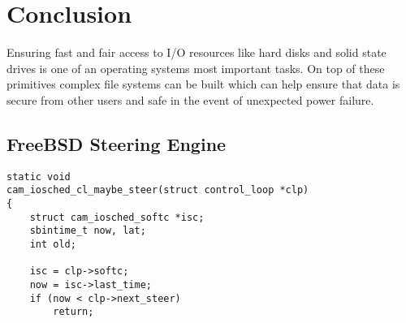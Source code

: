 \documentclass[10pt,conference,draftclsnofoot,onecolumn]{IEEEtran}
\begin{document}
\section{Conclusion}
Ensuring fast and fair access to I/O resources like hard disks and solid state drives is one of an operating systems most important tasks. On top of these primitives complex file systems can be built which can help ensure that data is secure from other users and safe in the event of unexpected power failure.

\clearpage
\printbibliography

\clearpage

\begin{appendices}
\section{FreeBSD Steering Engine}

\begin{lstlisting}
static void
cam_iosched_cl_maybe_steer(struct control_loop *clp)
{
	struct cam_iosched_softc *isc;
	sbintime_t now, lat;
	int old;

	isc = clp->softc;
	now = isc->last_time;
	if (now < clp->next_steer)
		return;


\end{lstlisting}
\end{appendices}
\end{document}
